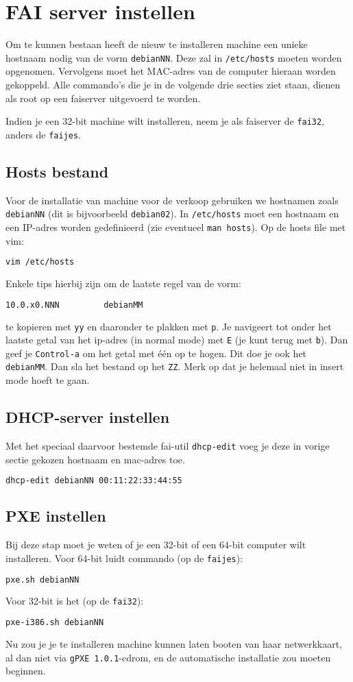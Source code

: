\section{FAI server instellen}
Om te kunnen bestaan heeft de nieuw te installeren machine een unieke hostnaam nodig van de vorm \texttt{debianNN}. Deze zal in \texttt{/etc/hosts} moeten worden opgenomen. Vervolgens moet het MAC-adres van de computer hieraan worden gekoppeld. Alle commando's die je in de volgende drie secties ziet staan, dienen als root op een faiserver uitgevoerd te worden.

Indien je een 32-bit machine wilt installeren, neem je als faiserver de \texttt{fai32}, anders de \texttt{faijes}.
\subsection{Hosts bestand}
Voor de installatie van machine voor de verkoop gebruiken we hostnamen zoals \texttt{debianNN} (dit is bijvoorbeeld \texttt{debian02}).
In \texttt{/etc/hosts} moet een hostnaam en een IP-adres worden gedefinieerd (zie eventueel \texttt{man hosts}).
Op de hosts file met vim:
\begin{lstlisting}[language=bash]
vim /etc/hosts
\end{lstlisting}
Enkele tips hierbij zijn om de laatste regel van de vorm:
\begin{lstlisting}[language=bash]
10.0.x0.NNN			debianMM
\end{lstlisting}
te kopieren met \texttt{yy} en daaronder te plakken met \texttt{p}. Je navigeert tot onder het laatste getal van het ip-adres (in normal mode) met \texttt{E} (je kunt terug met \texttt{b}). Dan geef je \texttt{Control-a} om het getal met \'{e}\'{e}n op te hogen. Dit doe je ook het \texttt{debianMM}. Dan sla het bestand op het \texttt{ZZ}. Merk op dat je helemaal niet in insert mode hoeft te gaan.
\subsection{DHCP-server instellen}
Met het speciaal daarvoor bestemde fai-util \texttt{dhcp-edit} voeg je deze in vorige sectie gekozen hostnaam en mac-adres toe.
\begin{lstlisting}[language=bash]
dhcp-edit debianNN 00:11:22:33:44:55
\end{lstlisting}
\subsection{PXE instellen}
Bij deze stap moet je weten of je een 32-bit of een 64-bit computer wilt installeren.
Voor 64-bit luidt commando (op de \texttt{faijes}):
\begin{lstlisting}[language=bash]
pxe.sh debianNN
\end{lstlisting}
Voor 32-bit is het (op de \texttt{fai32}):
\begin{lstlisting}[language=bash]
pxe-i386.sh debianNN
\end{lstlisting}

Nu zou je je te installeren machine kunnen laten booten van haar netwerkkaart, al dan niet via \texttt{gPXE 1.0.1}-cdrom,  en de automatische installatie zou moeten beginnen.

